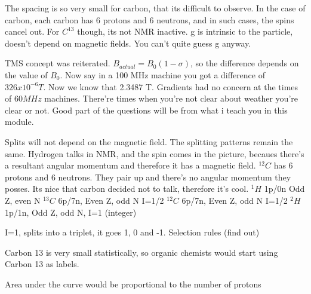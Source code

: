 		The spacing is so very small for carbon, that its difficult to observe. In the case of carbon, each carbon has 6 protons and 6 neutrons, and in such cases, the spins cancel out. For $C^13$ though, its not NMR inactive. g is intrinsic to the particle, doesn't depend on magnetic fields. You can't quite guess g anyway. 

		TMS concept was reiterated. $B_{actual}=B_0(1-\sigma)$, so the difference depends on the value of $B_0$. Now say in a 100 MHz machine you got a difference of $326x10^{-6}T$.  Now we know that 2.3487 T. Gradients had no concern at the times of $60 MHz$ machines. There're times when you're not clear about weather you're clear or not. Good part of the questions will be from what i teach you in this module.

		Splits will not depend on the magnetic field. The splitting patterns remain the same.
		Hydrogen talks in NMR, and the spin comes in the picture, becaues there's a resultant angular momentum and therefore it has a magnetic field. $^{12}C$ has 6 protons and 6 neutrons. They pair up and there's no angular momentum they posses. Its nice that carbon decided not to talk, therefore it's cool. 
		$^1H$ 1p/0n Odd Z, even N
		$^{13}C$ 6p/7n, Even Z, odd N I=1/2
		$^{12}C$ 6p/7n, Even Z, odd N I=1/2
		$^2H$ 1p/1n, Odd Z, odd N, I=1 (integer)

		I=1, splits into a triplet, it goes 1, 0 and -1. Selection rules (find out)

		Carbon 13 is very small statistically, so organic chemists would start using Carbon 13 as labels.

		Area under the curve would be proportional to the number of protons

		
